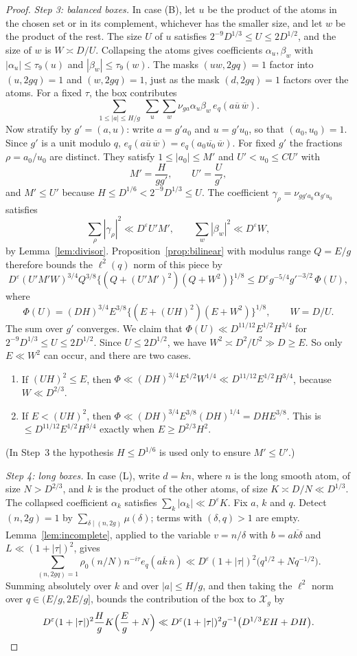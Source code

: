 \documentclass[11pt]{amsart}
\theoremstyle{definition}
\theoremstyle{remark}
\numberwithin{equation}{section}
\newcommand{\cX}{\mathcal X}
\newcommand{\eps}{\varepsilon}
\newcommand{\inv}[1]{\overline{#1}}
\begin{document}
\begin{proof}
\emph{Step 3: balanced boxes.}  In case (B), let $u$ be the product of the
atoms in the chosen set or in its complement, whichever has the smaller
size, and let $w$ be the product of the rest.  The size $U$ of $u$ satisfies
$2^{-9}D^{1/3}\le U\le2D^{1/2}$, and the size of $w$ is
$W\asymp D/U$.  Collapsing the atoms gives coefficients $\alpha_u,\beta_w$
with $|\alpha_u|\le\tau_9(u)$ and $|\beta_w|\le\tau_9(w)$.  The masks
$(uw,2gq)=1$ factor into $(u,2gq)=1$ and $(w,2gq)=1$, just as the mask
$(d,2gq)=1$ factors over the atoms.  For a fixed
$\tau$, the box contributes
\[
 \sum_{1\le|a|\le H/g}\ \sum_u\sum_w\nu_{ga}\alpha_u\beta_w\,
 e_q(a\inv u\,\inv w).
\]
Now stratify by $g'=(a,u)$: write $a=g'a_0$ and $u=g'u_0$, so that
$(a_0,u_0)=1$.  Since $g'$ is a unit modulo $q$,
$e_q(a\inv u\,\inv w)=e_q(a_0\inv{u_0}\,\inv w)$.  For fixed $g'$ the
fractions $\rho=a_0/u_0$ are distinct.  They satisfy $1\le|a_0|\le M'$ and
$U'<u_0\le CU'$ with
\[
 M'=\frac{H}{gg'},\qquad U'=\frac U{g'},
\]
and $M'\le U'$ because $H\le D^{1/6}<2^{-9}D^{1/3}\le U$.  The coefficient
$\gamma_\rho=\nu_{gg'a_0}\alpha_{g'u_0}$ satisfies
\[
 \sum_\rho|\gamma_\rho|^2\ll D^{\eps}U'M',
 \qquad
 \sum_w|\beta_w|^2\ll D^{\eps}W,
\]
by Lemma~\ref{lem:divisor}.  Proposition~\ref{prop:bilinear} with modulus
range $Q=E/g$ therefore bounds the $\ell^2(q)$ norm of this piece by
\[
 D^{\eps}(U'M'W)^{3/4}Q^{3/8}\{(Q+(U'M')^2)(Q+W^2)\}^{1/8}
 \le D^{\eps}g^{-5/4}g'^{-3/2}\,\Phi(U),
\]
where
\[
 \Phi(U)=(DH)^{3/4}E^{3/8}\{(E+(UH)^2)(E+W^2)\}^{1/8},
 \qquad W=D/U.
\]
The sum over $g'$ converges.  We claim that
$\Phi(U)\ll D^{11/12}E^{1/2}H^{3/4}$ for $2^{-9}D^{1/3}\le U\le2D^{1/2}$.
Since $U\le2D^{1/2}$, we have $W^2\asymp D^2/U^2\gg D\ge E$.  So only
$E\ll W^2$ can occur, and there are two cases.
\begin{enumerate}
\item If $(UH)^2\le E$, then
$\Phi\ll(DH)^{3/4}E^{1/2}W^{1/4}\ll D^{11/12}E^{1/2}H^{3/4}$, because
$W\ll D^{2/3}$.
\item If $E<(UH)^2$, then $\Phi\ll(DH)^{3/4}E^{3/8}(DH)^{1/4}
=DHE^{3/8}$.  This is $\le D^{11/12}E^{1/2}H^{3/4}$ exactly when
$E\ge D^{2/3}H^2$.
\end{enumerate}
(In Step~3 the hypothesis $H\le D^{1/6}$ is used only to ensure $M'\le U'$.)

\emph{Step 4: long boxes.}  In case (L), write $d=kn$, where $n$ is the long
smooth atom, of size $N>D^{2/3}$, and $k$ is the product of the other
atoms, of size $K\asymp D/N\ll D^{1/3}$.  The collapsed coefficient
$\alpha_k$ satisfies $\sum_k|\alpha_k|\ll D^{\eps}K$.  Fix $a$, $k$ and
$q$.  Detect $(n,2g)=1$ by $\sum_{\delta\mid(n,2g)}\mu(\delta)$; terms with
$(\delta,q)>1$ are empty.  Lemma~\ref{lem:incomplete}, applied to the
variable $v=n/\delta$ with $b=a\inv{k\delta}$ and $L\ll(1+|\tau|)^2$,
gives
\[
 \sum_{(n,2gq)=1}\rho_0(n/N)n^{-i\tau}e_q(a\inv k\,\inv n)
 \ll D^{\eps}(1+|\tau|)^2\bigl(q^{1/2}+Nq^{-1/2}\bigr).
\]
Summing absolutely over $k$ and over $|a|\le H/g$, and then taking the
$\ell^2$ norm over $q\in(E/g,2E/g]$, bounds the contribution of the box to
$\cX_g$ by
\[
 D^{\eps}(1+|\tau|)^2\frac Hg K\Bigl(\frac Eg+N\Bigr)
 \ll D^{\eps}(1+|\tau|)^2g^{-1}\bigl(D^{1/3}EH+DH\bigr).
\]


\end{proof}
\end{document}
